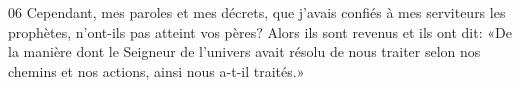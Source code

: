 
06 Cependant, mes paroles et mes décrets, que j’avais confiés à mes serviteurs les prophètes, n’ont-ils pas atteint vos pères? Alors ils sont revenus et ils ont dit: «De la manière dont le Seigneur de l’univers avait résolu de nous traiter selon nos chemins et nos actions, ainsi nous a-t-il traités.»